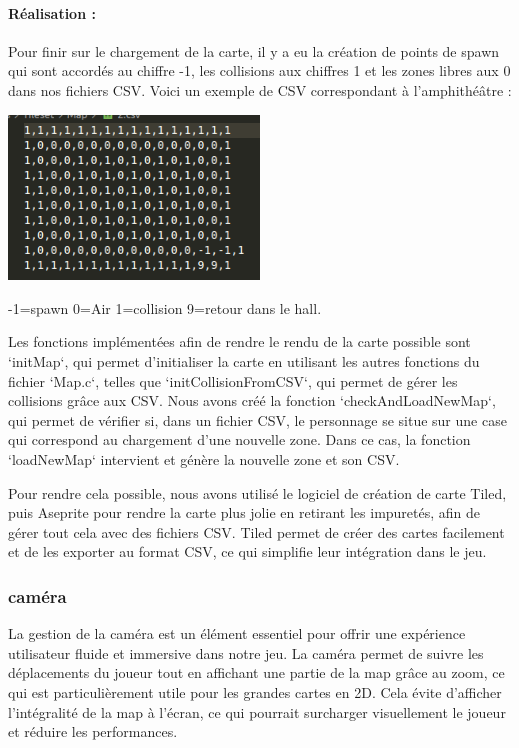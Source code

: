 \documentclass[12pt,a4paper, twoside]{article}
\begin{document}
    \paragraph{Réalisation : }
    Pour finir sur le chargement de la carte, il y a eu la création de points de spawn qui sont accordés au chiffre -1, les collisions aux chiffres 1 et les zones libres aux 0 dans nos fichiers CSV. 
    Voici un exemple de CSV correspondant à l'amphithéâtre :
    \begin{center}
    \includegraphics[width=0.5\textwidth]{hall.png}
    \end{center}
    \begin{center}
        \small{-1=spawn 0=Air 1=collision 9=retour dans le hall.}
    \end{center}
    
    Les fonctions implémentées afin de rendre le rendu de la carte possible sont `initMap`, qui permet d'initialiser la carte en utilisant les autres fonctions du fichier `Map.c`, telles que `initCollisionFromCSV`,
    qui permet de gérer les collisions grâce aux CSV. Nous avons créé la fonction `checkAndLoadNewMap`, qui permet de vérifier si, dans un fichier CSV, le personnage se situe sur une case qui correspond au chargement d'une nouvelle zone. Dans ce cas, 
    la fonction `loadNewMap` intervient et génère la nouvelle zone et son CSV.

    Pour rendre cela possible, nous avons utilisé le logiciel de création de carte Tiled, puis Aseprite pour rendre la carte plus jolie en retirant les impuretés, afin de gérer tout cela avec des fichiers CSV.
    Tiled permet de créer des cartes facilement et de les exporter au format CSV, ce qui simplifie leur intégration dans le jeu.
    \subsubsection{caméra}
    La gestion de la caméra est un élément essentiel pour offrir une expérience utilisateur fluide et immersive dans notre jeu. La caméra permet de suivre les déplacements du joueur tout en affichant une partie de la map grâce au zoom, ce qui est particulièrement utile pour les grandes cartes en 2D. Cela évite d'afficher l'intégralité de la map à l'écran, ce qui pourrait surcharger visuellement le joueur et réduire les performances.
\end{document}
